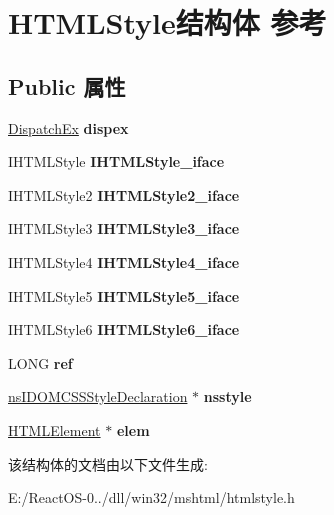 \hypertarget{struct_h_t_m_l_style}{}\section{H\+T\+M\+L\+Style结构体 参考}
\label{struct_h_t_m_l_style}
\subsection*{Public 属性}
\begin{DoxyCompactItemize}
\item 
\mbox{\label{struct_h_t_m_l_style_a1ee1e73b041759025e0da551de3a9c5b}} 
\hyperlink{struct_dispatch_ex}{Dispatch\+Ex} {\bfseries dispex}
\item 
\mbox{\label{struct_h_t_m_l_style_a7bf3b9d8190a5c6ce6679dd59255346f}} 
I\+H\+T\+M\+L\+Style {\bfseries I\+H\+T\+M\+L\+Style\+\_\+iface}
\item 
\mbox{\label{struct_h_t_m_l_style_a584e58b3d9149dbb613ea8e88f43e57e}} 
I\+H\+T\+M\+L\+Style2 {\bfseries I\+H\+T\+M\+L\+Style2\+\_\+iface}
\item 
\mbox{\label{struct_h_t_m_l_style_ac546afbf5c5efe7d3a32e4d6a85e9969}} 
I\+H\+T\+M\+L\+Style3 {\bfseries I\+H\+T\+M\+L\+Style3\+\_\+iface}
\item 
\mbox{\label{struct_h_t_m_l_style_a0a4dffb7202c12266177f10ea258c625}} 
I\+H\+T\+M\+L\+Style4 {\bfseries I\+H\+T\+M\+L\+Style4\+\_\+iface}
\item 
\mbox{\label{struct_h_t_m_l_style_af0b766f0cf68121e54e9ad79431bece0}} 
I\+H\+T\+M\+L\+Style5 {\bfseries I\+H\+T\+M\+L\+Style5\+\_\+iface}
\item 
\mbox{\label{struct_h_t_m_l_style_ad26a6f5c6114f16212ee3cf9814634f8}} 
I\+H\+T\+M\+L\+Style6 {\bfseries I\+H\+T\+M\+L\+Style6\+\_\+iface}
\item 
\mbox{\label{struct_h_t_m_l_style_a3620d6214fe715f043ed784462c6f541}} 
L\+O\+NG {\bfseries ref}
\item 
\mbox{\label{struct_h_t_m_l_style_a5a824a8a3fd1e74a8798432598463134}} 
\hyperlink{interfacens_i_d_o_m_c_s_s_style_declaration}{ns\+I\+D\+O\+M\+C\+S\+S\+Style\+Declaration} $\ast$ {\bfseries nsstyle}
\item 
\mbox{\label{struct_h_t_m_l_style_a902095414e543c748cc73f448ecffbaa}} 
\hyperlink{struct_h_t_m_l_element}{H\+T\+M\+L\+Element} $\ast$ {\bfseries elem}
\end{DoxyCompactItemize}


该结构体的文档由以下文件生成\+:\begin{DoxyCompactItemize}
\item 
E\+:/\+React\+O\+S-\/0../dll/win32/mshtml/htmlstyle.\+h\end{DoxyCompactItemize}
